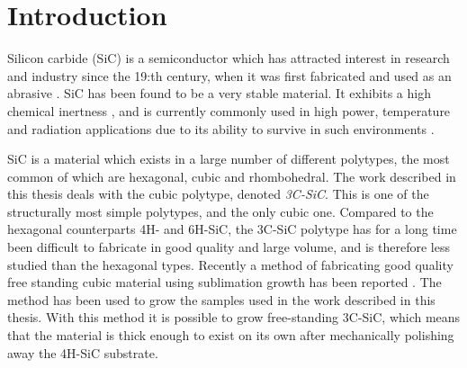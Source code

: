 
\chapter{Introduction}






Silicon carbide (SiC) is a semiconductor which has attracted interest in research and industry since the 19:th century, when it was first fabricated and used as an abrasive \cite{Acheson1893}. SiC has been found to be a very stable material. It exhibits a high chemical inertness \cite{Hume1941}, and is currently commonly used in high power, temperature and radiation applications due to its ability to survive in such environments \cite{J.B.CASADYandR.W.JOHNSON1996}. 

SiC is a material which exists in a large number of different polytypes, the most common of which are hexagonal, cubic and rhombohedral. The work described in this thesis deals with the cubic polytype, denoted \emph{3C-SiC}. This is one of the structurally most simple polytypes, and the only cubic one. Compared to the hexagonal counterparts 4H- and 6H-SiC, the 3C-SiC polytype has for a long time been difficult to fabricate in good quality and large volume, and is therefore less studied than the hexagonal types. Recently a method of fabricating good quality free standing cubic material using sublimation growth has been reported \cite{Jokubavicius2014}. The method has been used to grow the samples used in the work described in this thesis. With this method it is possible to grow free-standing 3C-SiC, which means that the material is thick enough to exist on its own after mechanically polishing away the 4H-SiC substrate. 

